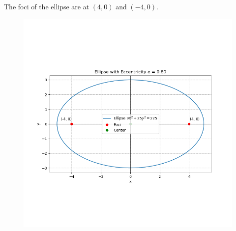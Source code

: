 \documentclass[journal]{IEEEtran}
\begin{document}
The foci of the ellipse are at $(4, 0)$ and $(-4, 0)$.


\begin{figure}[H]
    \centering
    \includegraphics[width=0.8\linewidth]{figs/ellipse.png}
    \caption{}
    \label{fig:placeholder}
\end{figure}
\end{document}
